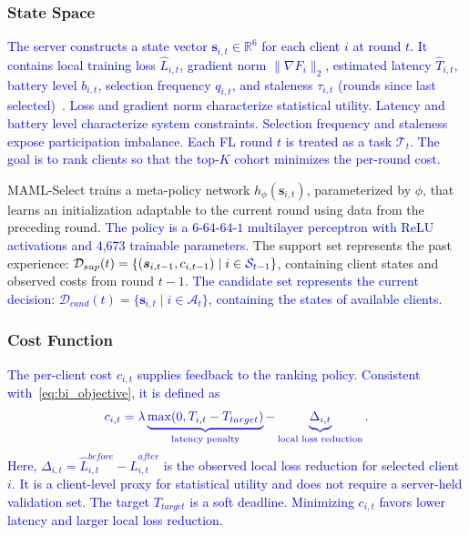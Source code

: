 \documentclass[journal]{IEEEtran}
\newcommand{\revision}[1]{\textcolor{blue}{#1}}
\begin{document}
\subsubsection{State Space}
\revision{The server constructs a state vector $\bm{s}_{i,t} \in \mathbb{R}^6$ for each client $i$ at round $t$. It contains local training loss $\hat{L}_{i,t}$, gradient norm $\|\nabla F_i\|_2$, estimated latency $\hat{T}_{i,t}$, battery level $b_{i,t}$, selection frequency $q_{i,t}$, and staleness $\tau_{i,t}$ (rounds since last selected)}~\cite{pan2024contextual,xu2024federated}. \revision{Loss and gradient norm characterize statistical utility. Latency and battery level characterize system constraints. Selection frequency and staleness expose participation imbalance. Each FL round $t$ is treated as a task $\mathcal{T}_t$. The goal is to rank clients so that the top-$K$ cohort minimizes the per-round cost.}

MAML-Select trains a meta-policy network $h_\phi(\bm{s}_{i,t})$, parameterized by $\phi$, that learns an initialization adaptable to the current round using data from the preceding round. \revision{The policy is a $6$-$64$-$64$-$1$ multilayer perceptron with ReLU activations and 4,673 trainable parameters.} The support set represents the past experience: $\mathcal{D}_{sup}(t) = \{(\bm{s}_{i,t-1}, c_{i,t-1}) \mid i \in \revision{\mathcal{S}_{t-1}}\}$, containing client states and observed costs from round $t-1$. \revision{The candidate set represents the current decision: $\mathcal{D}_{cand}(t) = \{\bm{s}_{i,t} \mid i \in \mathcal{A}_t\}$, containing the states of available clients.}

\subsubsection{Cost Function}
\revision{The per-client cost $c_{i,t}$ supplies feedback to the ranking policy. Consistent with~\eqref{eq:bi_objective}, it is defined as}
\begin{equation}
	\color{blue}
	c_{i,t} = \lambda \underbrace{\max(0, T_{i,t} - T_{target})}_{\text{latency penalty}} - \underbrace{\Delta_{i,t}}_{\text{local loss reduction}}.
	\label{eq:cost}
\end{equation}
\revision{Here, $\Delta_{i,t}=\hat{L}_{i,t}^{before}-\hat{L}_{i,t}^{after}$ is the observed local loss reduction for selected client $i$. It is a client-level proxy for statistical utility and does not require a server-held validation set. The target $T_{target}$ is a soft deadline. Minimizing $c_{i,t}$ favors lower latency and larger local loss reduction.}
\end{document}
